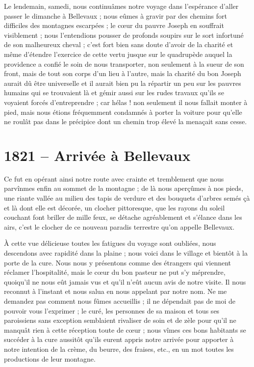 \documentclass[11pt,a4paper]{report}
\begin{document}
Le lendemain, samedi, nous continuâmes notre voyage dans l'espérance d'aller passer le dimanche à Bellevaux ; nous eûmes à gravir par des chemins fort difficiles des montagnes escarpées ; le cœur du pauvre Joseph en souffrait visiblement ; nous l'entendions pousser de profonds soupirs sur le sort infortuné de son malheureux cheval ; c'est fort bien sans doute d'avoir de la charité et même d'étendre l'exercice de cette vertu jusque sur le quadrupède auquel la providence a confié le soin de nous transporter, non seulement à la sueur de son front, mais de tout son corps d'un lieu à l'autre, mais la charité du bon Joseph aurait dû être universelle et il aurait bien pu la répartir un peu sur les pauvres humains qui se trouvaient là et gémir aussi sur les rudes travaux qu'ils se voyaient forcés d'entreprendre ; car hélas ! non seulement il nous fallait monter à pied, mais nous étions fréquemment condamnés à porter la voiture pour qu'elle ne roulât pas dans le précipice dont un chemin trop élevé la menaçait sans cesse.

\section*{1821 -- Arrivée à Bellevaux}

Ce fut en opérant ainsi notre route avec crainte et tremblement que nous parvînmes enfin au sommet de la montagne ; de là nous aperçûmes à nos pieds, une riante vallée au milieu des tapis de verdure et des bouquets d'arbres semés çà et là dont elle est décorée, un clocher pittoresque, que les rayons du soleil couchant font briller de mille feux, se détache agréablement et s'élance dans les airs, c'est le clocher de ce nouveau paradis terrestre qu'on appelle Bellevaux.

À cette vue délicieuse toutes les fatigues du voyage sont oubliées, nous descendons avec rapidité dans la plaine ; nous voici dans le village et bientôt à la porte de la cure. Nous nous y présentons comme des étrangers qui viennent réclamer l'hospitalité, mais le cœur du bon pasteur ne put s'y méprendre, quoiqu'il ne nous eût jamais vus et qu'il n'eût aucun avis de notre visite. Il nous reconnut à l'instant et nous salua en nous appelant par notre nom. Ne me demandez pas comment nous fûmes accueillis ; il ne dépendait pas de moi de pouvoir vous l'exprimer ; le curé, les personnes de sa maison et tous ses paroissiens sans exception semblaient rivaliser de soin et de zèle pour qu'il ne manquât rien à cette réception toute de cœur ; nous vîmes ces bons habitants se succéder à la cure aussitôt qu'ils eurent appris notre arrivée pour apporter à notre intention de la crème, du beurre, des fraises, etc., en un mot toutes les productions de leur montagne.
\end{document}
